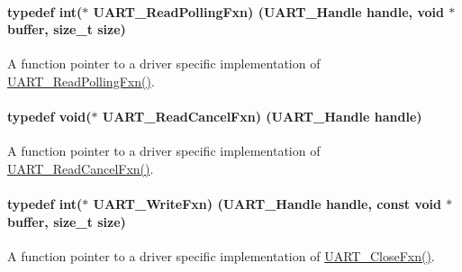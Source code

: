 \paragraph[{U\+A\+R\+T\+\_\+\+Read\+Polling\+Fxn}]{\setlength{\rightskip}{0pt plus 5cm}typedef int($\ast$ U\+A\+R\+T\+\_\+\+Read\+Polling\+Fxn) ({\bf U\+A\+R\+T\+\_\+\+Handle} handle, void $\ast$buffer, size\+\_\+t size)}\label{_u_a_r_t_8h_a6b57fb6a7c48272141a727c7de7290e4}


A function pointer to a driver specific implementation of \hyperlink{_u_a_r_t_8h_a6b57fb6a7c48272141a727c7de7290e4}{U\+A\+R\+T\+\_\+\+Read\+Polling\+Fxn()}. 

\paragraph[{U\+A\+R\+T\+\_\+\+Read\+Cancel\+Fxn}]{\setlength{\rightskip}{0pt plus 5cm}typedef void($\ast$ U\+A\+R\+T\+\_\+\+Read\+Cancel\+Fxn) ({\bf U\+A\+R\+T\+\_\+\+Handle} handle)}\label{_u_a_r_t_8h_aa46296acc2c197a775d44458e1eca197}


A function pointer to a driver specific implementation of \hyperlink{_u_a_r_t_8h_aa46296acc2c197a775d44458e1eca197}{U\+A\+R\+T\+\_\+\+Read\+Cancel\+Fxn()}. 

\paragraph[{U\+A\+R\+T\+\_\+\+Write\+Fxn}]{\setlength{\rightskip}{0pt plus 5cm}typedef int($\ast$ U\+A\+R\+T\+\_\+\+Write\+Fxn) ({\bf U\+A\+R\+T\+\_\+\+Handle} handle, const void $\ast$buffer, size\+\_\+t size)}\label{_u_a_r_t_8h_abe7ee32e202ad90d912b27693fe33672}


A function pointer to a driver specific implementation of \hyperlink{_u_a_r_t_8h_ae08ff15291bd6b21cb4e2eb1fce164a6}{U\+A\+R\+T\+\_\+\+Close\+Fxn()}. 

